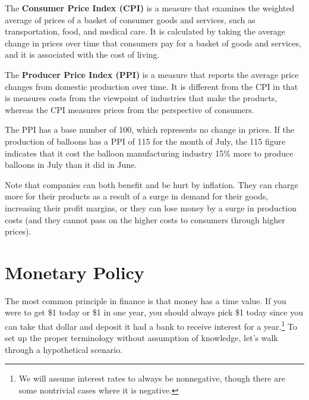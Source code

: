 \documentclass{article}
\begin{document}
  \begin{definition}
    The \textbf{Consumer Price Index (CPI)} is a measure that examines the weighted average of prices of a basket of consumer goods and services, such as transportation, food, and medical care. It is calculated by taking the average change in prices over time that consumers pay for a basket of goods and services, and it is associated with the cost of living. 
  \end{definition}

  \begin{definition}
    The \textbf{Producer Price Index (PPI)} is a measure that reports the average price changes from domestic production over time. It is different from the CPI in that is measures costs from the viewpoint of industries that make the products, whereas the CPI measures prices from the perspective of consumers. 
  \end{definition}

  \begin{example}
    The PPI has a base number of 100, which represents no change in prices. If the production of balloons has a PPI of 115 for the month of July, the 115 figure indicates that it cost the balloon manufacturing industry 15\% more to produce balloons in July than it did in June. 
  \end{example}

  Note that companies can both benefit and be hurt by inflation. They can charge more for their products as a result of a surge in demand for their goods, increasing their profit margins, or they can lose money by a surge in production costs (and they cannot pass on the higher costs to consumers through higher prices). 

\section{Monetary Policy}

    The most common principle in finance is that money has a time value. If you were to get \$1 today or \$1 in one year, you should always pick \$1 today since you can take that dollar and deposit it had a bank to receive interest for a year.\footnote{We will assume interest rates to always be nonnegative, though there are some nontrivial cases where it is negative.} To set up the proper terminology without assumption of knowledge, let's walk through a hypothetical scenario. 
\end{document}
